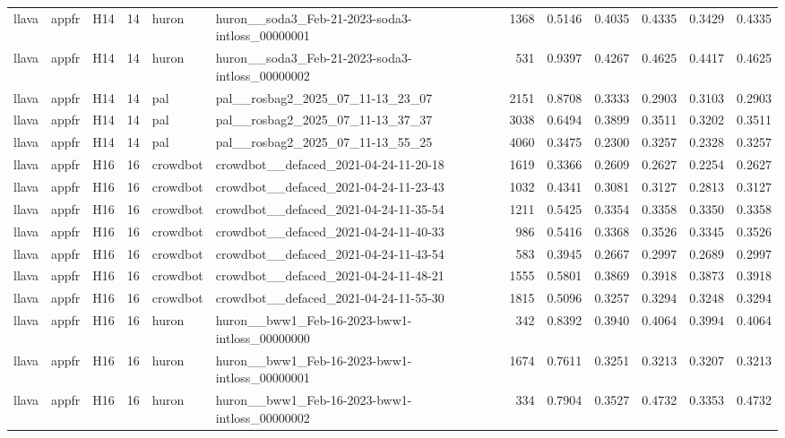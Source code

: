 \begin{table}[tbp]
\begin{tabular}{lllrllrrrrrr}
llava & appfr & H14 & 14 & huron & huron\_\_soda3\_Feb-21-2023-soda3-intloss\_00000001 & 1368 & 0.5146 & 0.4035 & 0.4335 & 0.3429 & 0.4335 \\
llava & appfr & H14 & 14 & huron & huron\_\_soda3\_Feb-21-2023-soda3-intloss\_00000002 & 531 & 0.9397 & 0.4267 & 0.4625 & 0.4417 & 0.4625 \\
llava & appfr & H14 & 14 & pal & pal\_\_rosbag2\_2025\_07\_11-13\_23\_07 & 2151 & 0.8708 & 0.3333 & 0.2903 & 0.3103 & 0.2903 \\
llava & appfr & H14 & 14 & pal & pal\_\_rosbag2\_2025\_07\_11-13\_37\_37 & 3038 & 0.6494 & 0.3899 & 0.3511 & 0.3202 & 0.3511 \\
llava & appfr & H14 & 14 & pal & pal\_\_rosbag2\_2025\_07\_11-13\_55\_25 & 4060 & 0.3475 & 0.2300 & 0.3257 & 0.2328 & 0.3257 \\
llava & appfr & H16 & 16 & crowdbot & crowdbot\_\_defaced\_2021-04-24-11-20-18 & 1619 & 0.3366 & 0.2609 & 0.2627 & 0.2254 & 0.2627 \\
llava & appfr & H16 & 16 & crowdbot & crowdbot\_\_defaced\_2021-04-24-11-23-43 & 1032 & 0.4341 & 0.3081 & 0.3127 & 0.2813 & 0.3127 \\
llava & appfr & H16 & 16 & crowdbot & crowdbot\_\_defaced\_2021-04-24-11-35-54 & 1211 & 0.5425 & 0.3354 & 0.3358 & 0.3350 & 0.3358 \\
llava & appfr & H16 & 16 & crowdbot & crowdbot\_\_defaced\_2021-04-24-11-40-33 & 986 & 0.5416 & 0.3368 & 0.3526 & 0.3345 & 0.3526 \\
llava & appfr & H16 & 16 & crowdbot & crowdbot\_\_defaced\_2021-04-24-11-43-54 & 583 & 0.3945 & 0.2667 & 0.2997 & 0.2689 & 0.2997 \\
llava & appfr & H16 & 16 & crowdbot & crowdbot\_\_defaced\_2021-04-24-11-48-21 & 1555 & 0.5801 & 0.3869 & 0.3918 & 0.3873 & 0.3918 \\
llava & appfr & H16 & 16 & crowdbot & crowdbot\_\_defaced\_2021-04-24-11-55-30 & 1815 & 0.5096 & 0.3257 & 0.3294 & 0.3248 & 0.3294 \\
llava & appfr & H16 & 16 & huron & huron\_\_bww1\_Feb-16-2023-bww1-intloss\_00000000 & 342 & 0.8392 & 0.3940 & 0.4064 & 0.3994 & 0.4064 \\
llava & appfr & H16 & 16 & huron & huron\_\_bww1\_Feb-16-2023-bww1-intloss\_00000001 & 1674 & 0.7611 & 0.3251 & 0.3213 & 0.3207 & 0.3213 \\
llava & appfr & H16 & 16 & huron & huron\_\_bww1\_Feb-16-2023-bww1-intloss\_00000002 & 334 & 0.7904 & 0.3527 & 0.4732 & 0.3353 & 0.4732 \\

\end{tabular}
\end{table}
